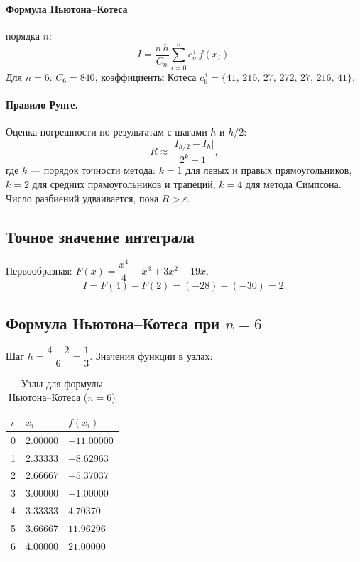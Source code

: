 \documentclass[12pt,a4paper]{article}
\begin{document}
\paragraph{Формула Ньютона--Котеса} порядка $n$:
\[
  I=\frac{n\,h}{C_n}\sum_{i=0}^{n}c_n^{\,i}\,f(x_i).
\]
Для $n=6$: $C_6=840$, коэффициенты Котеса $c_6^{\,i}=\{41,\,216,\,27,\,272,\,27,\,216,\,41\}$.

\paragraph{Правило Рунге.}
Оценка погрешности по результатам с шагами $h$ и $h/2$:
\[
  R\approx\frac{\bigl|I_{h/2}-I_{h}\bigr|}{2^{k}-1},
\]
где $k$ — порядок точности метода: $k=1$ для левых и правых прямоугольников, $k=2$ для
средних прямоугольников и трапеций, $k=4$ для метода Симпсона. Число разбиений удваивается,
пока $R>\varepsilon$.

\subsection{Точное значение интеграла}

Первообразная: $F(x)=\dfrac{x^{4}}{4}-x^{3}+3x^{2}-19x$.
\[
  I=F(4)-F(2)=(-28)-(-30)=\boxed{2}.
\]

\subsection{Формула Ньютона--Котеса при $n=6$}

Шаг $h=\dfrac{4-2}{6}=\dfrac{1}{3}$. Значения функции в узлах:

\begin{table}[H]
  \centering
  \caption{Узлы для формулы Ньютона--Котеса ($n=6$)}
  \begin{tabular}{C{1.4cm}C{2.8cm}C{3.2cm}}
    \toprule
    $i$ & $x_i$ & $f(x_i)$ \\
     & 2.00000 & $-11.00000$ \\
    1 & 2.33333 & $-8.62963$ \\
    2 & 2.66667 & $-5.37037$ \\
    3 & 3.00000 & $-1.00000$ \\
    4 & 3.33333 & $4.70370$ \\
    5 & 3.66667 & $11.96296$ \\
    6 & 4.00000 & $21.00000$ \\
    \bottomrule
  \end{tabular}
\end{table}
\end{document}
